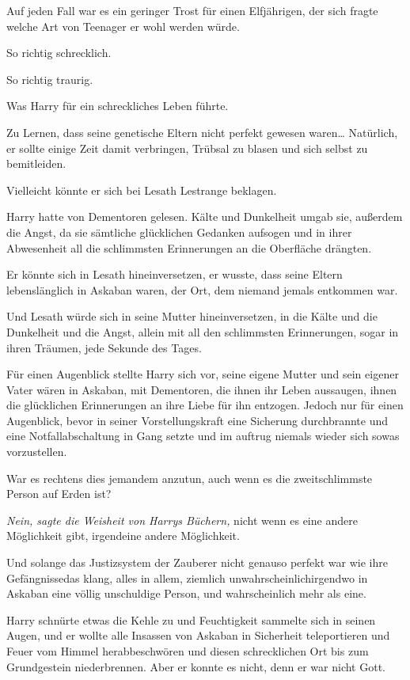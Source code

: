 {Auf jeden Fall war es ein geringer Trost für einen Elfjährigen, der sich fragte welche Art von Teenager er wohl werden würde.

So richtig schrecklich.

So richtig traurig.

Was Harry für ein schreckliches Leben führte.

Zu Lernen, dass seine genetische Eltern nicht perfekt gewesen waren… Natürlich, er sollte einige Zeit damit verbringen, Trübsal zu blasen und sich selbst zu bemitleiden.

Vielleicht könnte er sich bei Lesath Lestrange beklagen.

Harry hatte von Dementoren gelesen. Kälte und Dunkelheit umgab sie, außerdem die Angst, da sie sämtliche glücklichen Gedanken aufsogen und in ihrer Abwesenheit all die schlimmsten Erinnerungen an die Oberfläche drängten.

Er könnte sich in Lesath hineinversetzen, er wusste, dass seine Eltern lebenslänglich in Askaban waren, der Ort, dem niemand jemals entkommen war.

Und Lesath würde sich in seine Mutter hineinversetzen, in die Kälte und die Dunkelheit und die Angst, allein mit all den schlimmsten Erinnerungen, sogar in ihren Träumen, jede Sekunde des Tages.

Für einen Augenblick stellte Harry sich vor, seine eigene Mutter und sein eigener Vater wären in Askaban, mit Dementoren, die ihnen ihr Leben aussaugen, ihnen die glücklichen Erinnerungen an ihre Liebe für ihn entzogen. Jedoch nur für einen Augenblick, bevor in seiner Vorstellungskraft eine Sicherung durchbrannte und eine Notfallabschaltung in Gang setzte und im auftrug niemals wieder sich sowas vorzustellen.

War es rechtens dies jemandem anzutun, auch wenn es die zweitschlimmste Person auf Erden ist?

\emph{Nein, sagte die Weisheit von Harrys Büchern,} nicht wenn es eine andere Möglichkeit gibt, irgendeine andere Möglichkeit.

Und solange das Justizsystem der Zauberer nicht genauso perfekt war wie ihre Gefängnisse\laterund das klang, alles in allem, ziemlich unwahrscheinlich\laterwar irgendwo in Askaban eine völlig unschuldige Person, und wahrscheinlich mehr als eine.

Harry schnürte etwas die Kehle zu und Feuchtigkeit sammelte sich in seinen Augen, und er wollte alle Insassen von Askaban in Sicherheit teleportieren und Feuer vom Himmel herabbeschwören und diesen schrecklichen Ort bis zum Grundgestein niederbrennen. Aber er konnte es nicht, denn er war nicht Gott.

}
